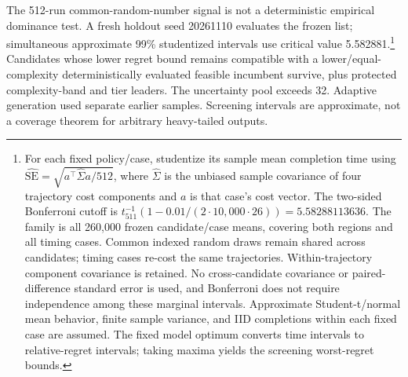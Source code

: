 \documentclass[11pt]{article}
\theoremstyle{definition}\newtheorem{definition}[theorem]{Definition}
\begin{document}
The 512-run common-random-number signal is not a deterministic empirical dominance test. A fresh holdout seed 20261110 evaluates the frozen list; simultaneous approximate 99\% studentized intervals use critical value 5.582881.\footnote{For each fixed policy/case, studentize its sample mean completion time using $\widehat{\mathrm{SE}}=\sqrt{a^\top\widehat\Sigma a/512}$, where $\widehat\Sigma$ is the unbiased sample covariance of four trajectory cost components and $a$ is that case's cost vector. The two-sided Bonferroni cutoff is $t_{511}^{-1}(1-0.01/(2\cdot10{,}000\cdot26))=5.58288113636$. The family is all 260,000 frozen candidate/case means, covering both regions and all timing cases. Common indexed random draws remain shared across candidates; timing cases re-cost the same trajectories. Within-trajectory component covariance is retained. No cross-candidate covariance or paired-difference standard error is used, and Bonferroni does not require independence among these marginal intervals. Approximate Student-t/normal mean behavior, finite sample variance, and IID completions within each fixed case are assumed. The fixed model optimum converts time intervals to relative-regret intervals; taking maxima yields the screening worst-regret bounds.} Candidates whose lower regret bound remains compatible with a lower/equal-complexity deterministically evaluated feasible incumbent survive, plus protected complexity-band and tier leaders. The uncertainty pool exceeds 32. Adaptive generation used separate earlier samples. Screening intervals are approximate, not a coverage theorem for arbitrary heavy-tailed outputs.
\end{document}
